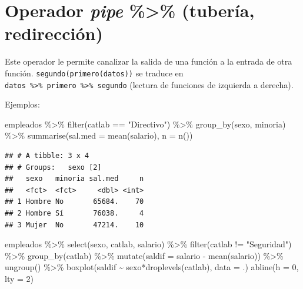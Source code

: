 \documentclass[
]{book}
\newenvironment{Shaded}{\begin{snugshade}}{\end{snugshade}}
\newcommand{\AttributeTok}[1]{\textcolor[rgb]{0.77,0.63,0.00}{#1}}
\newcommand{\DecValTok}[1]{\textcolor[rgb]{0.00,0.00,0.81}{#1}}
\newcommand{\FunctionTok}[1]{\textcolor[rgb]{0.00,0.00,0.00}{#1}}
\newcommand{\NormalTok}[1]{#1}
\newcommand{\SpecialCharTok}[1]{\textcolor[rgb]{0.00,0.00,0.00}{#1}}
\newcommand{\StringTok}[1]{\textcolor[rgb]{0.31,0.60,0.02}{#1}}
\theoremstyle{break}
\begin{document}
\hypertarget{operador-pipe-tuberuxeda-redirecciuxf3n}{%
\section{\texorpdfstring{Operador \emph{pipe} \textbf{\%\textgreater\% }(tubería, redirección)}{Operador pipe \%\textgreater\% (tubería, redirección)}}\label{operador-pipe-tuberuxeda-redirecciuxf3n}}

Este operador le permite canalizar la salida de una función a la entrada de otra función.
\texttt{segundo(primero(datos))} se traduce en \texttt{datos\ \%\textgreater{}\%\ primero\ \%\textgreater{}\%\ segundo}
(lectura de funciones de izquierda a derecha).

Ejemplos:

\begin{Shaded}
\begin{Highlighting}[]
\NormalTok{empleados }\SpecialCharTok{\%\textgreater{}\%}  \FunctionTok{filter}\NormalTok{(catlab }\SpecialCharTok{==} \StringTok{"Directivo"}\NormalTok{) }\SpecialCharTok{\%\textgreater{}\%}
          \FunctionTok{group\_by}\NormalTok{(sexo, minoria) }\SpecialCharTok{\%\textgreater{}\%}
          \FunctionTok{summarise}\NormalTok{(}\AttributeTok{sal.med =} \FunctionTok{mean}\NormalTok{(salario), }\AttributeTok{n =} \FunctionTok{n}\NormalTok{())}
\end{Highlighting}
\end{Shaded}

\begin{verbatim}
## # A tibble: 3 x 4
## # Groups:   sexo [2]
##   sexo   minoria sal.med     n
##   <fct>  <fct>     <dbl> <int>
## 1 Hombre No       65684.    70
## 2 Hombre Sí       76038.     4
## 3 Mujer  No       47214.    10
\end{verbatim}

\begin{Shaded}
\begin{Highlighting}[]
\NormalTok{empleados }\SpecialCharTok{\%\textgreater{}\%} \FunctionTok{select}\NormalTok{(sexo, catlab, salario) }\SpecialCharTok{\%\textgreater{}\%}
          \FunctionTok{filter}\NormalTok{(catlab }\SpecialCharTok{!=} \StringTok{"Seguridad"}\NormalTok{) }\SpecialCharTok{\%\textgreater{}\%}
          \FunctionTok{group\_by}\NormalTok{(catlab) }\SpecialCharTok{\%\textgreater{}\%}
          \FunctionTok{mutate}\NormalTok{(}\AttributeTok{saldif =}\NormalTok{ salario }\SpecialCharTok{{-}} \FunctionTok{mean}\NormalTok{(salario)) }\SpecialCharTok{\%\textgreater{}\%}
          \FunctionTok{ungroup}\NormalTok{() }\SpecialCharTok{\%\textgreater{}\%}
          \FunctionTok{boxplot}\NormalTok{(saldif }\SpecialCharTok{\textasciitilde{}}\NormalTok{ sexo}\SpecialCharTok{*}\FunctionTok{droplevels}\NormalTok{(catlab), }\AttributeTok{data =}\NormalTok{ .)}
\FunctionTok{abline}\NormalTok{(}\AttributeTok{h =} \DecValTok{0}\NormalTok{, }\AttributeTok{lty =} \DecValTok{2}\NormalTok{)}
\end{Highlighting}
\end{Shaded}
\end{document}
